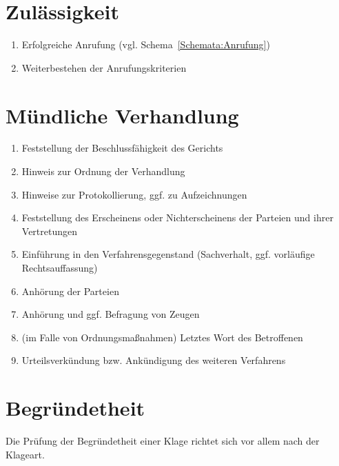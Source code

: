 \section{Zulässigkeit}
\begin{enumerate}
\item Erfolgreiche Anrufung (vgl. Schema~\ref{Schemata:Anrufung})
\item Weiterbestehen der Anrufungskriterien
\end{enumerate}

\section{Mündliche Verhandlung}
\begin{enumerate}
\item Feststellung der Beschlussfähigkeit des Gerichts
\item Hinweis zur Ordnung der Verhandlung
\item Hinweise zur Protokollierung, ggf. zu Aufzeichnungen
\item Feststellung des Erscheinens oder Nichterscheinens der Parteien und ihrer Vertretungen
\item Einführung in den Verfahrensgegenstand (Sachverhalt, ggf. vorläufige Rechtsauffassung)
\item Anhörung der Parteien
\item Anhörung und ggf. Befragung von Zeugen
\item (im Falle von Ordnungsmaßnahmen) Letztes Wort des Betroffenen
\item Urteilsverkündung bzw. Ankündigung des weiteren Verfahrens
\end{enumerate}

\section{Begründetheit}
Die Prüfung der Begründetheit einer Klage richtet sich vor allem nach der Klageart.

